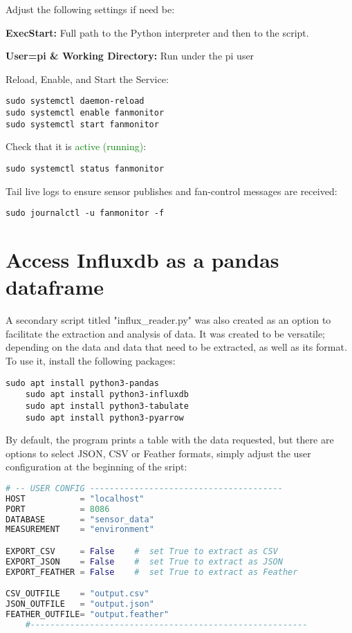 \documentclass[onecolumn]{article}
\begin{document}
Adjust the following settings if need be:\\
\small

\textbf{ExecStart:} Full path to the Python interpreter and then to the script.

\textbf{User=pi \& Working Directory:} Run under the pi user

\normalsize

Reload, Enable, and Start the Service:
\begin{lstlisting}[numbers=none]
sudo systemctl daemon-reload
sudo systemctl enable fanmonitor
sudo systemctl start fanmonitor
\end{lstlisting}

Check that it is \textcolor{green}{active (running)}:

\begin{lstlisting}[numbers=none]
    sudo systemctl status fanmonitor
\end{lstlisting}


Tail live logs to ensure sensor publishes and fan-control messages are received:

\begin{lstlisting}[numbers=none]
    sudo journalctl -u fanmonitor -f
\end{lstlisting}

\section{Access Influxdb as a pandas dataframe}
A secondary script titled "influx\_reader.py" was also created as an option to facilitate the extraction and analysis of data. It was created to be versatile; depending on the data and data that need to be extracted, as well as its format. To use it, install the following packages:

\begin{lstlisting}[numbers=none]
    sudo apt install python3-pandas
    sudo apt install python3-influxdb
    sudo apt install python3-tabulate
    sudo apt install python3-pyarrow
\end{lstlisting}

By default, the program prints a table with the data requested, but there are options to select JSON, CSV or Feather formats, simply adjust the user configuration at the beginning of the sript:
\begin{lstlisting}[numbers=none, language=python]
    # -- USER CONFIG --------------------------------------- 
HOST           = "localhost"
PORT           = 8086
DATABASE       = "sensor_data"
MEASUREMENT    = "environment"

EXPORT_CSV     = False    #  set True to extract as CSV
EXPORT_JSON    = False    #  set True to extract as JSON
EXPORT_FEATHER = False    #  set True to extract as Feather

CSV_OUTFILE    = "output.csv"
JSON_OUTFILE   = "output.json"
FEATHER_OUTFILE= "output.feather"
    #--------------------------------------------------------
\end{lstlisting}
\end{document}
